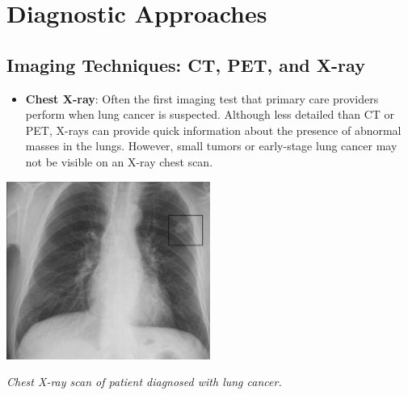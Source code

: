 
\section{Diagnostic Approaches}


\subsection{Imaging Techniques: CT, PET, and X-ray}

\begin{itemize}
    \item \textbf{Chest X-ray}: Often the first imaging test that primary care providers perform 
    when lung cancer is suspected. Although less detailed than CT or PET, X-rays can provide quick 
    information about the presence of abnormal masses in the lungs. However, small tumors or 
    early-stage lung cancer may not be visible on an X-ray chest scan. \cite{lung_cancer_diagnosis}
\end{itemize}

\vspace{1em}
\begin{center}
    \includegraphics[width=0.5\textwidth]{../assets/04-diagnosis/lc-x-ray.png}
    
    \small\textit{Chest X-ray scan of patient diagnosed with lung cancer. \cite{inbook}}
\end{center}
\vspace{1em}

